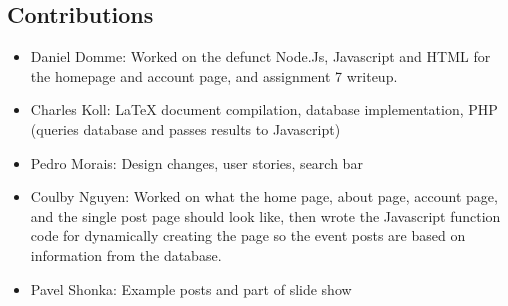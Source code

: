 \documentclass[12pt]{article}
\begin{document}
\quad

\subsection{Contributions}
\begin{itemize}
\item
	Daniel Domme: Worked on the defunct Node.Js, Javascript and HTML for the
	homepage and account page, and assignment 7 writeup.
\item
	Charles Koll: LaTeX document compilation, database implementation, PHP
	(queries database and passes results to Javascript)
\item
	Pedro Morais: Design changes, user stories, search bar 
\item
	Coulby Nguyen: Worked on what the home page, about page, account page, and
	the single post page should look like, then wrote the Javascript function
	code for dynamically creating the page so the event posts are based on
	information from the database.
\item
	Pavel Shonka: Example posts and part of slide show
\end{itemize}
\end{document}
